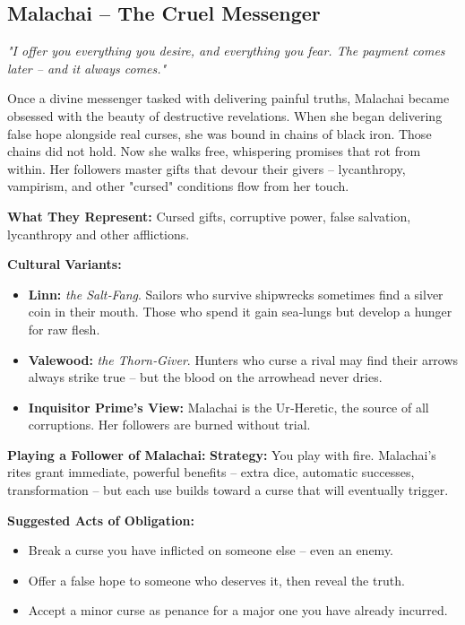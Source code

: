 \documentclass[10pt,a5paper]{book}
\begin{document}
\subsection{Malachai -- The Cruel Messenger}
\label{patron:malachai}

\textit{"I offer you everything you desire, and everything you fear. The payment comes later -- and it always comes."}

Once a divine messenger tasked with delivering painful truths, Malachai became obsessed with the beauty of destructive revelations. When she began delivering false hope alongside real curses, she was bound in chains of black iron. Those chains did not hold. Now she walks free, whispering promises that rot from within. Her followers master gifts that devour their givers -- lycanthropy, vampirism, and other "cursed" conditions flow from her touch.

\textbf{What They Represent:} Cursed gifts, corruptive power, false salvation, lycanthropy and other afflictions.

\textbf{Cultural Variants:}
\begin{itemize}
    \item \textbf{Linn:} \textit{the Salt‑Fang}. Sailors who survive shipwrecks sometimes find a silver coin in their mouth. Those who spend it gain sea‑lungs but develop a hunger for raw flesh.
    \item \textbf{Valewood:} \textit{the Thorn‑Giver}. Hunters who curse a rival may find their arrows always strike true -- but the blood on the arrowhead never dries.
    \item \textbf{Inquisitor Prime's View:} Malachai is the Ur‑Heretic, the source of all corruptions. Her followers are burned without trial.
\end{itemize}

\textbf{Playing a Follower of Malachai:}
\textbf{Strategy:} You play with fire. Malachai's rites grant immediate, powerful benefits -- extra dice, automatic successes, transformation -- but each use builds toward a curse that will eventually trigger.

\textbf{Suggested Acts of Obligation:}
\begin{itemize}
    \item Break a curse you have inflicted on someone else -- even an enemy.
    \item Offer a false hope to someone who deserves it, then reveal the truth.
    \item Accept a minor curse as penance for a major one you have already incurred.
\end{itemize}
\end{document}
